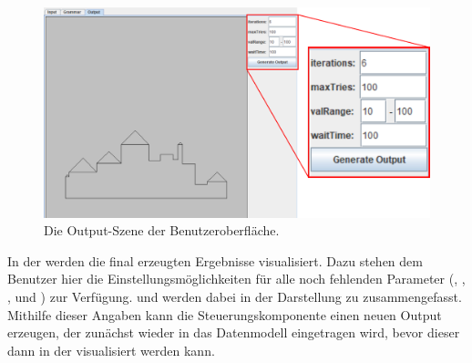 \begin{figure}[H]
    \centering
    \includegraphics[width=\textwidth*3/4]{images/output_scene.pdf}
    \caption{Die Output-Szene der Benutzeroberfläche.}
    \label{fig:output_scene}
\end{figure}

In der  werden die final erzeugten Ergebnisse visualisiert. Dazu stehen dem Benutzer hier die Einstellungsmöglichkeiten
für alle noch fehlenden Parameter (, , ,  und ) zur
Verfügung.  und  werden dabei in der Darstellung zu  zusammengefasst. Mithilfe dieser Angaben
kann die Steuerungskomponente einen neuen Output erzeugen, der zunächst wieder in das Datenmodell eingetragen wird, bevor dieser dann in der
 visualisiert werden kann.
